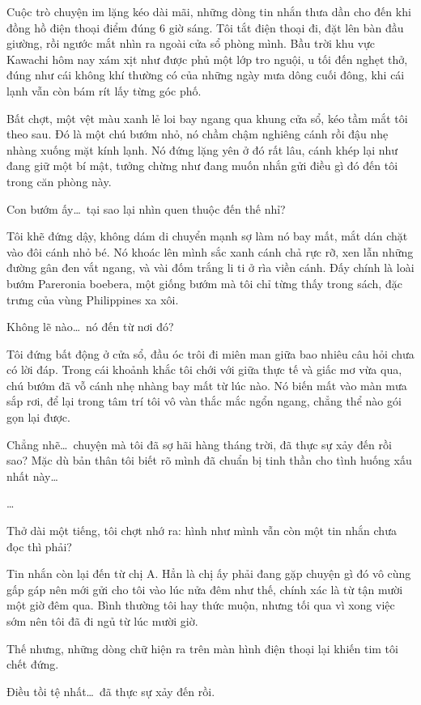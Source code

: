 \documentclass[../main.tex]{subfiles}
\begin{document}
Cuộc trò chuyện im lặng kéo dài mãi, những dòng tin nhắn thưa dần cho đến khi đồng hồ điện thoại điểm đúng 6 giờ sáng. Tôi tắt điện thoại đi, đặt lên bàn đầu giường, rồi ngước mắt nhìn ra ngoài cửa sổ phòng mình. Bầu trời khu vực Kawachi hôm nay xám xịt như được phủ một lớp tro nguội, u tối đến nghẹt thở, đúng như cái không khí thường có của những ngày mưa dông cuối đông, khi cái lạnh vẫn còn bám rít lấy từng góc phố.

Bất chợt, một vệt màu xanh lẻ loi bay ngang qua khung cửa sổ, kéo tầm mắt tôi theo sau. Đó là một chú bướm nhỏ, nó chầm chậm nghiêng cánh rồi đậu nhẹ nhàng xuống mặt kính lạnh. Nó đứng lặng yên ở đó rất lâu, cánh khép lại như đang giữ một bí mật, tưởng chừng như đang muốn nhắn gửi điều gì đó đến tôi trong căn phòng này.

Con bướm ấy\dots\ tại sao lại nhìn quen thuộc đến thế nhỉ?

Tôi khẽ đứng dậy, không dám di chuyển mạnh sợ làm nó bay mất, mắt dán chặt vào đôi cánh nhỏ bé. Nó khoác lên mình sắc xanh cánh chả rực rỡ, xen lẫn những đường gân đen vắt ngang, và vài đốm trắng li ti ở rìa viền cánh. Đấy chính là loài bướm Pareronia boebera, một giống bướm mà tôi chỉ từng thấy trong sách, đặc trưng của vùng Philippines xa xôi.

Không lẽ nào\dots\ nó đến từ nơi đó?

Tôi đứng bất động ở cửa sổ, đầu óc trôi đi miên man giữa bao nhiêu câu hỏi chưa có lời đáp. Trong cái khoảnh khắc tôi chới với giữa thực tế và giấc mơ vừa qua, chú bướm đã vỗ cánh nhẹ nhàng bay mất từ lúc nào. Nó biến mất vào màn mưa sắp rơi, để lại trong tâm trí tôi vô vàn thắc mắc ngổn ngang, chẳng thể nào gói gọn lại được.

Chẳng nhẽ\dots\ chuyện mà tôi đã sợ hãi hàng tháng trời, đã thực sự xảy đến rồi sao? Mặc dù bản thân tôi biết rõ mình đã chuẩn bị tinh thần cho tình huống xấu nhất này\dots

\dots

Thở dài một tiếng, tôi chợt nhớ ra: hình như mình vẫn còn một tin nhắn chưa đọc thì phải?

Tin nhắn còn lại đến từ chị A. Hẳn là chị ấy phải đang gặp chuyện gì đó vô cùng gấp gáp nên mới gửi cho tôi vào lúc nửa đêm như thế, chính xác là từ tận mười một giờ đêm qua. Bình thường tôi hay thức muộn, nhưng tối qua vì xong việc sớm nên tôi đã đi ngủ từ lúc mười giờ.

Thế nhưng, những dòng chữ hiện ra trên màn hình điện thoại lại khiến tim tôi chết đứng.

Điều tồi tệ nhất\dots\ đã thực sự xảy đến rồi.
\end{document}
